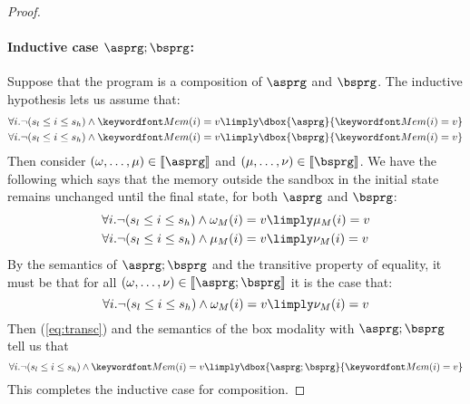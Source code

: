 \documentclass[11pt,twoside]{scrartcl}
\begin{document}
\begin{proof}
\paragraph{Inductive case $\asprg;\bsprg$:}
Suppose that the program is a composition of $\asprg$ and $\bsprg$. The inductive hypothesis lets us assume that:
\begin{align}
\forall i . \lnot(s_l \le i \le s_h)  \land \pderef{i}=v &\limply \dbox{\asprg}{\pderef{i}=v} \\
\forall i . \lnot(s_l \le i \le s_h)  \land \pderef{i}=v &\limply \dbox{\bsprg}{\pderef{i}=v}
\end{align}
Then consider $(\omega,\ldots,\mu) \in \llbracket\asprg\rrbracket$ and $(\mu,\ldots,\nu) \in \llbracket\bsprg\rrbracket$. We have the following which says that the memory outside the sandbox in the initial state remains unchanged until the final state, for both $\asprg$ and $\bsprg$:
\begin{align}
\label{eq:trans1}
\forall i . \lnot(s_l \le i \le s_h)  \land \omega_M(i)=v &\limply \mu_M(i)=v \\
\label{eq:trans2}
\forall i . \lnot(s_l \le i \le s_h)  \land \mu_M(i)=v &\limply \nu_M(i)=v
\end{align}
By the semantics of $\asprg;\bsprg$ and the transitive property of equality, it must be that for all $(\omega,\ldots,\nu)\in\llbracket\asprg;\bsprg\rrbracket$ it is the case that:
\begin{equation}
\label{eq:transc}
\forall i . \lnot(s_l \le i \le s_h)  \land \omega_M(i)=v \limply \nu_M(i)=v
\end{equation}
Then (\ref{eq:transc}) and the semantics of the box modality with $\asprg;\bsprg$ tell us that 
\begin{equation}
\forall i . \lnot(s_l \le i \le s_h)  \land \pderef{i}=v \limply \dbox{\asprg;\bsprg}{\pderef{i}=v}
\end{equation}
This completes the inductive case for composition. 


\end{proof}
\end{document}

